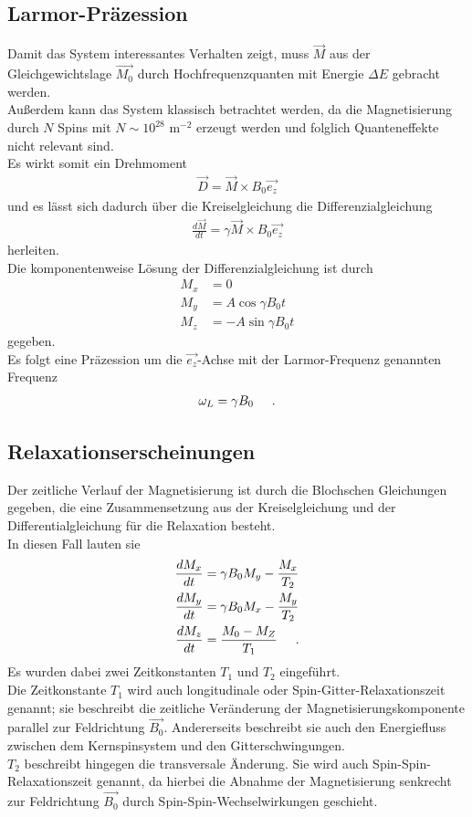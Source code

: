 \documentclass[]{scrartcl}
\begin{document}
\subsection{Larmor-Präzession}
Damit das System interessantes Verhalten zeigt, muss $\vec{M}$ aus der Gleichgewichtslage $\vec{M_0}$ durch Hochfrequenzquanten mit Energie $\Delta E$ gebracht werden.\\
Außerdem kann das System klassisch betrachtet werden, da die Magnetisierung durch $N$ Spins mit $N \sim 10^{28}$ m$^{-2}$ erzeugt werden und folglich Quanteneffekte nicht relevant sind.\\
Es wirkt somit ein Drehmoment
\begin{align}
\vec{D}=\vec{M}\times B_0 \vec{e_z}
\end{align}
und es lässt sich dadurch über die Kreiselgleichung die Differenzialgleichung
\begin{align}
\frac{d \vec{M}}{d t} = \gamma \vec{M}\times B_0 \vec{e_z}\label{eq::magzeit}
\end{align}
herleiten.\\
Die komponentenweise Lösung der Differenzialgleichung ist durch
\begin{align}
M_x&= 0 \\
M_y&= A \cos \gamma B_0 t \\
M_z&= -A \sin \gamma B_0 t
\end{align}
gegeben.\\
Es folgt eine Präzession um die $\vec{e_z}$-Achse mit der Larmor-Frequenz genannten Frequenz
\begin{align}
\omega_L =\gamma B_0 \hspace*{0.5cm}\text{.}
\end{align}
\subsection{Relaxationserscheinungen}
Der zeitliche Verlauf der Magnetisierung ist durch die Blochschen Gleichungen gegeben, die eine Zusammensetzung aus der Kreiselgleichung und der Differentialgleichung für die Relaxation besteht.\\
In diesen Fall lauten sie
\begin{align}
\frac{d M_x}{d t}&= \gamma B_0 M_y - \frac{M_x}{T_2}\label{eq::bloch1}\\
\frac{d M_y}{d t}&= \gamma B_0 M_x - \frac{M_y}{T_2}\label{eq::bloch2}\\
\frac{d M_z}{d t}&= \frac{M_0-M_Z}{T_1}\hspace*{0.5cm}\text{.}\label{eq::bloch3}
\end{align}
Es wurden dabei zwei Zeitkonstanten $T_1$ und $T_2$ eingeführt.\\
Die Zeitkonstante $T_1$ wird auch longitudinale oder Spin-Gitter-Relaxationszeit genannt; sie beschreibt die zeitliche Veränderung der Magnetisierungskomponente parallel zur Feldrichtung $\vec{B_0}$. Andererseits beschreibt sie auch den Energiefluss zwischen dem Kernspinsystem und den Gitterschwingungen.\\
$T_2$ beschreibt hingegen die transversale Änderung. Sie wird auch Spin-Spin-Relaxationszeit genannt, da hierbei die Abnahme der Magnetisierung senkrecht zur Feldrichtung $\vec{B_0}$ durch Spin-Spin-Wechselwirkungen geschieht.
\end{document}
